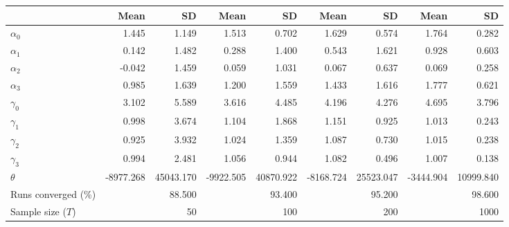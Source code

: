 
\begin{tabular}[t]{lrrrrrrrr}
\toprule
  & Mean & SD & Mean  & SD  & Mean   & SD   & Mean    & SD   \\
\midrule
$\alpha_{0}$ & 1.445 & 1.149 & 1.513 & 0.702 & 1.629 & 0.574 & 1.764 & 0.282\\
$\alpha_{1}$ & 0.142 & 1.482 & 0.288 & 1.400 & 0.543 & 1.621 & 0.928 & 0.603\\
$\alpha_{2}$ & -0.042 & 1.459 & 0.059 & 1.031 & 0.067 & 0.637 & 0.069 & 0.258\\
$\alpha_{3}$ & 0.985 & 1.639 & 1.200 & 1.559 & 1.433 & 1.616 & 1.777 & 0.621\\
$\gamma_{0}$ & 3.102 & 5.589 & 3.616 & 4.485 & 4.196 & 4.276 & 4.695 & 3.796\\
$\gamma_{1}$ & 0.998 & 3.674 & 1.104 & 1.868 & 1.151 & 0.925 & 1.013 & 0.243\\
$\gamma_{2}$ & 0.925 & 3.932 & 1.024 & 1.359 & 1.087 & 0.730 & 1.015 & 0.238\\
$\gamma_{3}$ & 0.994 & 2.481 & 1.056 & 0.944 & 1.082 & 0.496 & 1.007 & 0.138\\
$\theta$ & -8977.268 & 45043.170 & -9922.505 & 40870.922 & -8168.724 & 25523.047 & -3444.904 & 10999.840\\
Runs converged (\%) &  & 88.500 &  & 93.400 &  & 95.200 &  & 98.600\\
Sample size ($T$) &  & 50 &  & 100 &  & 200 &  & 1000\\
\bottomrule
\end{tabular}
